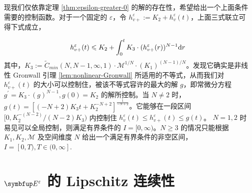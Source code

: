 现我们仅依靠定理 \ref{thm:epsilon-greater-0} 的解的存在性，希望给出一个上面条件需要的控制函数。对于一个固定的 $\varepsilon$，令 $h_{v+}^\varepsilon:=K_2+h_v^\varepsilon(t)$，上面三式联立可得下式成立，

\begin{equation}
h_{v+}^\varepsilon(t) \leqslant K_{2}+\int_{0}^{t} K_{3} \cdot(h_{v+}^\varepsilon(r))^{N-1} \mathrm{d} r \\
\end{equation}
其中，$K_{3}:=\tilde{C}_{min}(N, N-1, \infty, 1) \cdot \mathcal{M}^{1 / N} \cdot\left(K_{1}\right)^{(N-1) / N}$。发现它确实是非线性 Gronwall 引理 \ref{lem:nonlinear-Gronwall} 所适用的不等式，从而我们对 $h_{v+}^\varepsilon(t) $ 的大小可以控制住，被该不等式容许的最大的解 $g$，即常微分方程 $g^{\prime}=K_{3} \cdot(g)^{N-1}, g(0)=K_{2}$ 的解所控制。当 $N\neq 2$ 时，$g(t) = [(-N+2)K_3 t+K_2^{-N+2}]^{\frac{1}{-N+2}}$。它能够在一段区间 $[0, K_2^{-(N-2)}/(N-2)K_3)$ 内控制住 $h_{v}^\varepsilon(t) \leqslant h_{v+}^\varepsilon(t) \leqslant g(t)$。  $N=1,2$ 时易见可以全局控制，则满足有界条件的 $I=[0, \infty)$。$N \geqslant 3$ 的情况只能根据 $K_1,K_2,\mathcal{M}$ 及空间维度 $N$ 给出一个满足有界条件的非空区间， $I=[0, T), T \in( 0, \infty]$.



    



\section{\texorpdfstring{$\vE^{\varepsilon}$}{Lg} 的 Lipschitz 连续性}

